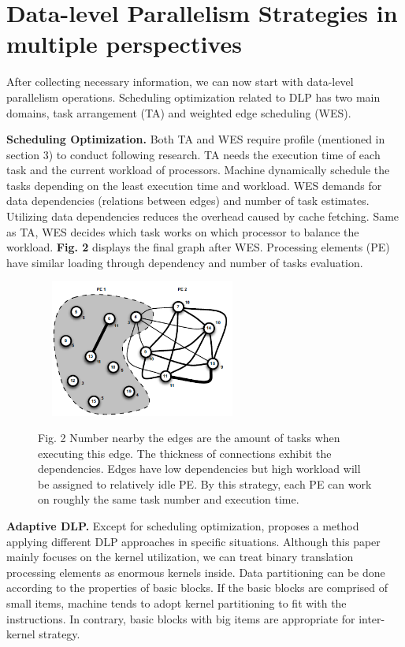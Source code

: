 \documentclass[sigconf, nonacm, natbib=false]{acmart}
\begin{document}
\section{Data-level Parallelism Strategies in multiple perspectives}
After collecting necessary information, we can now start with data-level parallelism operations. Scheduling optimization related to DLP has two main domains, task arrangement (TA)\parencite{task_arrangement} and weighted edge scheduling (WES)\parencite{weighted_edge_scheduling}. 

{\bf Scheduling Optimization.} Both TA and WES require profile (mentioned in section 3) to conduct following research. TA needs the execution time of each task and the current workload of processors. Machine dynamically schedule the tasks depending on the least execution time and workload. WES demands for data dependencies (relations between edges) and number of task estimates. Utilizing data dependencies reduces the overhead caused by cache fetching. Same as TA, WES decides which task works on which processor to balance the workload. {\bf Fig. 2} displays the final graph after WES. Processing elements (PE) have similar loading through dependency and number of tasks evaluation. 

\begin{figure}[ht]
\begin{center}
\includegraphics[height=4.5cm, width=7cm]{pic2.PNG}
\end{center}
{\footnotesize Fig. 2 Number nearby the edges are the amount of tasks when executing this edge. The thickness of connections exhibit the dependencies. Edges have low dependencies but high workload will be assigned to relatively idle PE. By this strategy, each PE can work on roughly the same task number and execution time.}
\end{figure}

{\bf Adaptive DLP.} Except for scheduling optimization, \parencite{adaptive_dlp} proposes a method applying different DLP approaches in specific situations. Although this paper mainly focuses on the kernel utilization, we can treat binary translation processing elements as enormous kernels inside. Data partitioning can be done according to the properties of basic blocks. If the basic blocks are comprised of small items, machine tends to adopt kernel partitioning to fit with the instructions. In contrary, basic blocks with big items are appropriate for inter-kernel strategy. 
\end{document}
